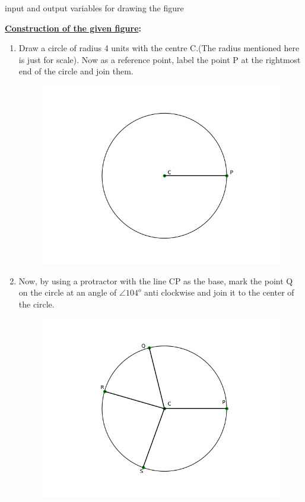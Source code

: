 \documentclass[journal,12pt,twocolumn]{IEEEtran}
\begin{document}
\begin{table}[ht]
    \centering
    
    \caption{input and output variables for drawing the figure}
\end{table}
\textbf{\underline{Construction of the given figure}: }\\
\begin{enumerate}
\item Draw a circle of radius 4 units with the centre C.(The radius mentioned here is just for scale). Now as a reference point, label the point P at the rightmost end of the circle and join them.
\begin{figure}[ht]
    \centering
    \includegraphics[scale = 0.5]{figs/cnstrct_fig1.png}
\end{figure}
\newpage
\item Now, by using a protractor with the line CP as the base, mark the point Q on the circle at an angle of $\angle 104^o$ anti clockwise and join it to the center of the circle.
\begin{figure}[ht]
    \centering
    \includegraphics[scale = 0.5]{figs/cnstrct_fig2.png}

\end{figure}
\end{enumerate}
\end{document}
